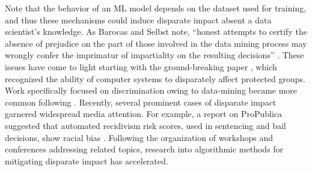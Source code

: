 Note that the behavior of an ML model 
depends on the dataset used for training, 
and thus these mechanisms could induce disparate impact absent a data scientist's knowledge. 
As Barocas and Selbst note, 
``honest  attempts  to  certify the absence of prejudice on the
part of those involved in the data
mining process may wrongly confer the 
imprimatur of impartiality on the resulting decisions'' \cite{barocas2016big}.
These issues have come to light starting with the ground-breaking paper \cite{friedman1996bias},
which recognized the ability of computer systems to disparately affect protected groups.
Work specifically focused on discrimination owing to data-mining
became more common following \cite{pedreshi2008discrimination}. 
Recently, several prominent cases of disparate impact 
garnered widespread media attention.
For example, a report on ProPublica 
suggested that automated recidivism risk scores, 
used in sentencing and bail decisions, 
show racial bias \cite{MachineBias20}.
Following the organization of workshops 
and conferences addressing related topics,
research into algorithmic methods for mitigating
disparate impact has accelerated.
